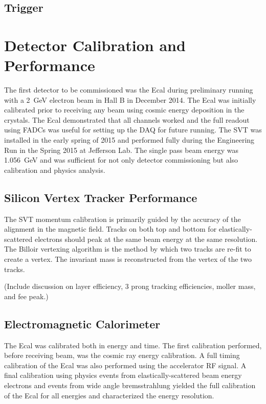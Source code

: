 \documentclass[12pt]{report}
\begin{document}
\section{Trigger}


\chapter{Detector Calibration and Performance} 

The first detector to be commissioned was the Ecal during preliminary running with a 2~GeV electron beam in Hall B in December 2014. The Ecal was initially calibrated prior to receiving any beam using cosmic energy deposition in the crystals. The Ecal demonstrated that all channels worked and the full readout using FADCs was useful for setting up the DAQ for future running. The SVT was installed in the early spring of 2015 and performed fully during the Engineering Run in the Spring 2015 at Jefferson Lab. The single pass beam energy was 1.056~GeV and was sufficient for not only detector commissioning but also calibration and physics analysis. 

\section{Silicon Vertex Tracker Performance}

The SVT momentum calibration is primarily guided by the accuracy of the alignment in the magnetic field. Tracks on both top and bottom for elastically-scattered electrons should peak at the same beam energy at the same resolution. The Billoir vertexing algorithm is the method by which two tracks are re-fit to create a vertex. The invariant mass is reconstructed from the vertex of the two tracks. 




(Include discussion on layer efficiency, 3 prong tracking efficiencies, moller mass, and fee peak.)


\section{Electromagnetic Calorimeter}

The Ecal was calibrated both in energy and time. The first calibration performed, before receiving beam, was the cosmic ray energy calibration. A full timing calibration of the Ecal was also performed using the accelerator RF signal. A final calibration using physics events from elastically-scattered beam energy electrons and events from wide angle bremsstrahlung yielded the full calibration of the Ecal for all energies and characterized the energy resolution. 
\end{document}
